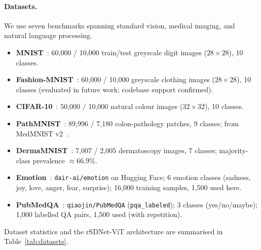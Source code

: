 \paragraph{Datasets.}
We use seven benchmarks spanning standard vision, medical imaging, and natural
language processing.
\begin{itemize}[leftmargin=*,itemsep=2pt]
  \item \textbf{MNIST}~\citep{MNIST}: 60{,}000 / 10{,}000 train/test
        greyscale digit images ($28{\times}28$), 10 classes.
  \item \textbf{Fashion-MNIST}~\citep{FASHION-MNIST}: 60{,}000 / 10{,}000
        greyscale clothing images ($28{\times}28$), 10 classes
        (evaluated in future work; codebase support confirmed).
  \item \textbf{CIFAR-10}~\citep{CIFAR-10}: 50{,}000 / 10{,}000
        natural colour images ($32{\times}32$), 10 classes.
  \item \textbf{PathMNIST}~\citep{MedMNIST-PathMNIST+DermaMNIST}: 89{,}996 / 7{,}180
        colon-pathology patches, 9 classes; from MedMNIST v2~\citep{MedMNIST-PathMNIST+DermaMNIST}.
  \item \textbf{DermaMNIST}~\citep{MedMNIST-PathMNIST+DermaMNIST}: 7{,}007 / 2{,}005
        dermatoscopy images, 7 classes; majority-class prevalence $\approx66.9\%$.
  \item \textbf{Emotion}~\citep{saravia2018}: \texttt{dair-ai/emotion} on Hugging Face;
        6 emotion classes (sadness, joy, love, anger, fear, surprise);
        16{,}000 training samples, 1{,}500 used here.
  \item \textbf{PubMedQA}~\citep{PubMedQA}: \texttt{qiaojin/PubMedQA} (\texttt{pqa\_labeled});
        3 classes (yes/no/maybe); 1{,}000 labelled QA pairs, 1{,}500 used (with repetition).
\end{itemize}
Dataset statistics and the rSDNet-ViT architecture are summarised in
Table~\ref{tab:datasets}.


